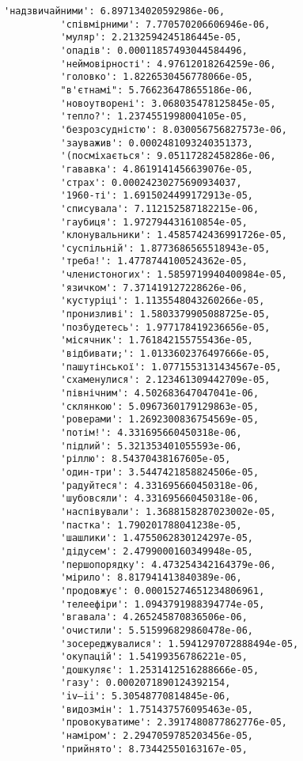 \documentclass[11pt]{article}
\begin{document}
\begin{Verbatim}[commandchars=\\\{\}]
          'надзвичайними': 6.897134020592986e-06,
          'співмірними': 7.770570206606946e-06,
          'муляр': 2.2132594245186445e-05,
          'опадів': 0.00011857493044584496,
          'неймовірності': 4.97612018264259e-06,
          'головко': 1.8226530456778066e-05,
          "в'єтнамі": 5.766236478655186e-06,
          'новоутворені': 3.068035478125845e-05,
          'тепло?': 1.2374551998004105e-05,
          'безрозсудністю': 8.030056756827573e-06,
          'зауважив': 0.0002481093240351373,
          '(посміхається': 9.05117282458286e-06,
          'гававка': 4.8619141456639076e-05,
          'страх': 0.00024230275690934037,
          '1960-ті': 1.6915024499172913e-05,
          'списувала': 7.112152587182215e-06,
          'гаубиця': 1.972794431610854e-05,
          'клонувальники': 1.4585742436991726e-05,
          'суспільній': 1.8773686565518943e-05,
          'треба!': 1.4778744100524362e-05,
          'членистоногих': 1.5859719940400984e-05,
          'язичком': 7.371419127228626e-06,
          'кустуріці': 1.1135548043260266e-05,
          'пронизливі': 1.5803379905088725e-05,
          'позбудетесь': 1.977178419236656e-05,
          'місячник': 1.761842155755436e-05,
          'відбивати;': 1.0133602376497666e-05,
          'пашутінської': 1.0771553131434567e-05,
          'схаменулися': 2.123461309442709e-05,
          'північним': 4.502683647047041e-06,
          'склянкою': 5.0967360179129863e-05,
          'роверами': 1.2692300836754569e-05,
          'потім!': 4.331695660450318e-06,
          'підлий': 5.321353401055593e-06,
          'ріллю': 8.54370438167605e-05,
          'один-три': 3.5447421858824506e-05,
          'радуйтеся': 4.331695660450318e-06,
          'шубовсяли': 4.331695660450318e-06,
          'наспівували': 1.3688158287023002e-05,
          'пастка': 1.790201788041238e-05,
          'шашлики': 1.4755062830124297e-05,
          'дідусем': 2.4799000160349948e-05,
          'першопорядку': 4.473254342164379e-06,
          'мірило': 8.817941413840389e-06,
          'продовжує': 0.00015274651234806961,
          'телеефіри': 1.0943791988394774e-05,
          'вгавала': 4.265245870836506e-06,
          'очистили': 5.515996829860478e-06,
          'зосереджувалися': 1.5941297072888494e-05,
          'окупацій': 1.54199356786221e-05,
          'дошкуляє': 1.2531412516288666e-05,
          'газу': 0.0002071890124392154,
          'iv—ii': 5.30548770814845e-06,
          'видозмін': 1.751437576095463e-05,
          'провокуватиме': 2.3917480877862776e-05,
          'наміром': 2.2947059785203456e-05,
          'прийнято': 8.73442550163167e-05,

\end{Verbatim}
\end{document}
